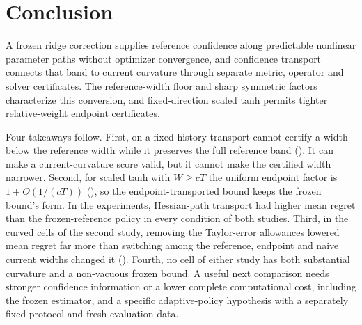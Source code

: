 \section{Conclusion}\label{sec:conclusion}

A frozen ridge correction supplies reference confidence along predictable
nonlinear parameter paths without optimizer convergence, and confidence
transport connects that band to current curvature through separate metric,
operator and solver certificates. The reference-width floor and sharp
symmetric factors characterize this conversion, and fixed-direction scaled tanh
permits tighter relative-weight endpoint certificates.

Four takeaways follow. First, on a fixed history transport cannot certify a
width below the reference width while it preserves the full reference band
(). It can make a current-curvature score
valid, but it cannot make the certified width narrower. Second, for scaled tanh
with $W\ge cT$ the uniform endpoint factor is $1+O(1/(cT))$
(), so the endpoint-transported bound keeps the
frozen bound's form. In the experiments, Hessian-path transport had higher mean
regret than the frozen-reference policy in every condition of both studies.
Third, in the curved cells of the second study, removing the Taylor-error
allowances lowered mean regret far more than switching among the reference,
endpoint and naive current widths changed it
(). Fourth, no cell of either study has both
substantial curvature and a non-vacuous frozen bound. A useful next comparison
needs stronger confidence information or a lower complete computational cost,
including the frozen estimator, and a specific adaptive-policy hypothesis with
a separately fixed protocol and fresh evaluation data.
